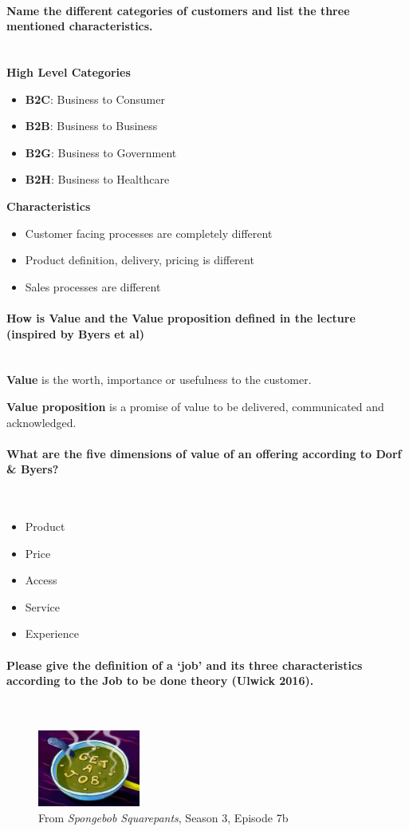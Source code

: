 \documentclass[10pt,a4paper,noendnumber=true]{scrartcl}
\newcommand{\properparagraph}[1]{\paragraph{\textcolor{Emerald}{#1}}\mbox{}\\}
\begin{document}
\properparagraph{Name the different categories of customers and list the three mentioned characteristics.}

\textbf{High Level Categories}
\begin{itemize}
	\item \textbf{B2C}: Business to Consumer
	\item \textbf{B2B}: Business to Business
	\item \textbf{B2G}: Business to Government
	\item \textbf{B2H}: Business to Healthcare
\end{itemize}

\textbf{Characteristics}
\begin{itemize}
	\item Customer facing processes are completely different
	\item Product definition, delivery, pricing is different
	\item Sales processes are different
\end{itemize}

\properparagraph{How is Value and the Value proposition defined in the lecture (inspired by Byers et al)}
\textbf{Value} is the worth, importance or usefulness to the customer.

\textbf{Value proposition} is a promise of value to be delivered, communicated and acknowledged.

\properparagraph{What are the five dimensions of value of an offering according to Dorf \& Byers?}

\begin{itemize}
	\item Product
	\item Price
	\item Access
	\item Service
	\item Experience
\end{itemize}
\properparagraph{ Please give the definition of a ‘job’ and its three characteristics according to the Job to be done theory (Ulwick 2016).}
\begin{figure}[H]
	\centering
	\includegraphics[width = 0.3\textwidth]{img/joob.jpg}
	\caption{From \textit{Spongebob Squarepants}, Season 3, Episode 7b}
\end{figure}
\end{document}
